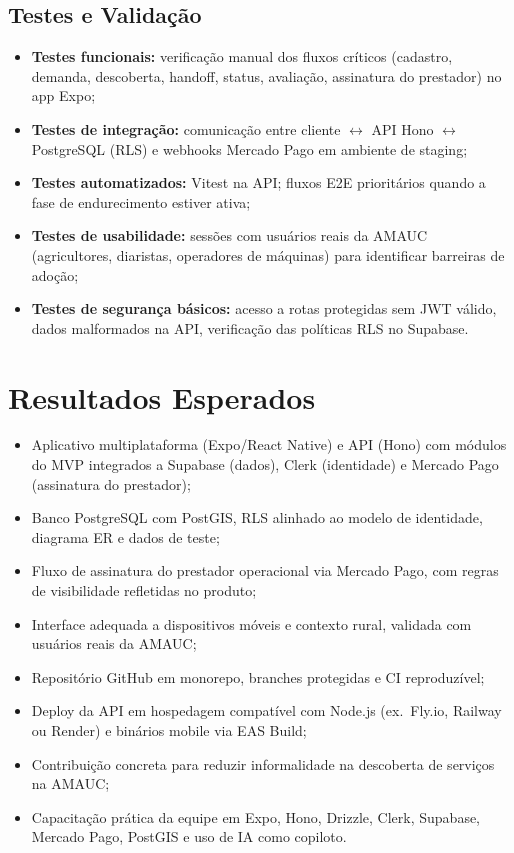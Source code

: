 \documentclass[12pt, a4paper]{article}
\begin{document}
\subsection{Testes e Validação}

\begin{itemize}
  \item \textbf{Testes funcionais:} verificação manual dos fluxos
        críticos (cadastro, demanda, descoberta, handoff, status,
        avaliação, assinatura do prestador) no app Expo;
  \item \textbf{Testes de integração:} comunicação entre cliente
        $\leftrightarrow$ API Hono $\leftrightarrow$ PostgreSQL
        (RLS) e webhooks Mercado Pago em ambiente de staging;
  \item \textbf{Testes automatizados:} Vitest na API; fluxos E2E
        prioritários quando a fase de endurecimento estiver ativa;
  \item \textbf{Testes de usabilidade:} sessões com usuários reais
        da AMAUC (agricultores, diaristas, operadores de máquinas)
        para identificar barreiras de adoção;
  \item \textbf{Testes de segurança básicos:} acesso a rotas
        protegidas sem JWT válido, dados malformados na API,
        verificação das políticas RLS no Supabase.
\end{itemize}

\section{Resultados Esperados}

\begin{itemize}
  \item Aplicativo multiplataforma (Expo/React Native) e API (Hono)
        com módulos do MVP integrados a Supabase (dados), Clerk
        (identidade) e Mercado Pago (assinatura do prestador);
  \item Banco PostgreSQL com PostGIS, RLS alinhado ao modelo de
        identidade, diagrama ER e dados de teste;
  \item Fluxo de assinatura do prestador operacional via Mercado Pago,
        com regras de visibilidade refletidas no produto;
  \item Interface adequada a dispositivos móveis e contexto rural,
        validada com usuários reais da AMAUC;
  \item Repositório GitHub em monorepo, branches protegidas e CI
        reproduzível;
  \item Deploy da API em hospedagem compatível com Node.js (ex.\
        Fly.io, Railway ou Render) e binários mobile via EAS Build;
  \item Contribuição concreta para reduzir informalidade na descoberta
        de serviços na AMAUC;
  \item Capacitação prática da equipe em Expo, Hono, Drizzle, Clerk,
        Supabase, Mercado Pago, PostGIS e uso de IA como copiloto.
\end{itemize}
\end{document}
